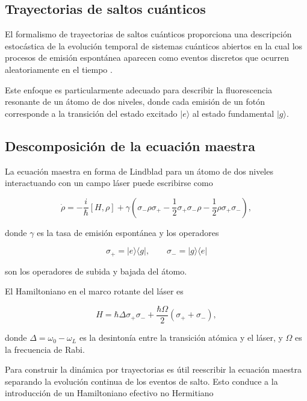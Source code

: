 \documentclass[11pt]{report}
\begin{document}
\subsection{Trayectorias de saltos cuánticos}

El formalismo de trayectorias de saltos cuánticos proporciona una descripción estocástica de la evolución temporal de sistemas cuánticos abiertos en la cual los procesos de emisión espontánea aparecen como eventos discretos que ocurren aleatoriamente en el tiempo \cite{Carmichael1993}.

Este enfoque es particularmente adecuado para describir la fluorescencia resonante de un átomo de dos niveles, donde cada emisión de un fotón corresponde a la transición del estado excitado $|e\rangle$ al estado fundamental $|g\rangle$.

\subsection{Descomposición de la ecuación maestra}

La ecuación maestra en forma de Lindblad para un átomo de dos niveles interactuando con un campo láser puede escribirse como

\begin{equation}
\dot{\rho} =
-\frac{i}{\hbar}[H,\rho]
+
\gamma
\left(
\sigma_- \rho \sigma_+
-
\frac{1}{2}
\sigma_+\sigma_- \rho
-
\frac{1}{2}
\rho\sigma_+\sigma_-
\right),
\end{equation}

donde $\gamma$ es la tasa de emisión espontánea y los operadores

\begin{equation}
\sigma_+ = |e\rangle\langle g|, 
\qquad
\sigma_- = |g\rangle\langle e|
\end{equation}

son los operadores de subida y bajada del átomo.

El Hamiltoniano en el marco rotante del láser es

\begin{equation}
H =
\hbar\Delta \sigma_+\sigma_-
+
\frac{\hbar\Omega}{2}
(\sigma_+ + \sigma_-),
\end{equation}

donde $\Delta = \omega_0 - \omega_L$ es la desintonía entre la transición atómica y el láser, y $\Omega$ es la frecuencia de Rabi.

Para construir la dinámica por trayectorias es útil reescribir la ecuación maestra separando la evolución continua de los eventos de salto. Esto conduce a la introducción de un Hamiltoniano efectivo no Hermitiano
\end{document}
